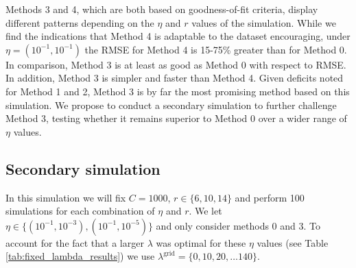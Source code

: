 \documentclass[oupdraft]{bio}
\newcommand{\lambdagrid}{\lambda^{\text{grid}}}
\begin{document}
Methods 3 and 4, which are both based on goodness-of-fit criteria, display different patterns depending on the $\eta$ and $r$ values of the simulation.
While we find the indications that Method 4 is adaptable to the dataset encouraging, under $\eta = (10^{-1}, 10^{-1})$ the RMSE for Method 4 is 15-75\% greater than for Method 0. In comparison, Method 3 is at least as good as Method 0 with respect to RMSE. In addition,  Method 3 is simpler and faster than Method 4.  Given deficits noted for Method 1 and 2, Method 3 is by far the most promising method based on this simulation.  We propose to conduct a secondary simulation to further challenge Method 3, testing whether it remains superior to Method 0 over a wider range of $\eta$ values.




\subsection{Secondary simulation}
\label{sec:tuning_simulation_2}


In this simulation we will fix $C = 1000$, $r \in \{6, 10, 14\}$ and perform 100 simulations for each combination of $\eta$ and $r$.  We let $\eta \in \{ (10^{-1}, 10^{-3}), (10^{-1}, 10^{-5}) \}$ and only consider methods 0 and 3.  To account for the fact that a larger $\lambda$ was optimal for these $\eta$ values (see Table \ref{tab:fixed_lambda_results}) we use $\lambdagrid = \{0,10,20, \dots 140 \}$.
\end{document}

